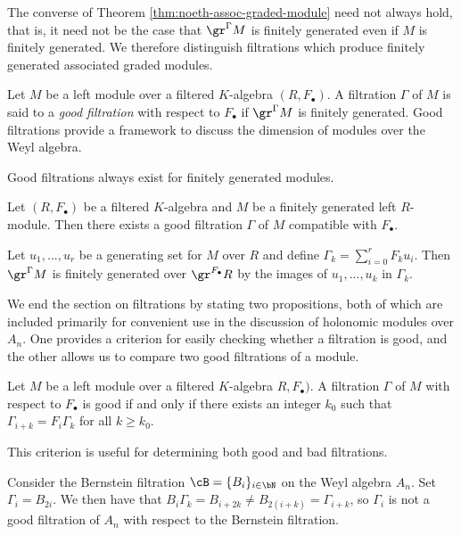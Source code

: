 The converse of Theorem \ref{thm:noeth-assoc-graded-module} need not always hold, that is, it need not be the case that $\gr^{\Gamma}M$ is finitely generated even if $M$ is finitely generated. We therefore distinguish filtrations which produce finitely generated associated graded modules.
\begin{defn}\label{defn:good-filtration}
	Let $M$ be a left module over a filtered $K$-algebra $(R,F_\bullet)$. A filtration $\Gamma$ of $M$ is said to a \emph{good filtration} with respect to $F_\bullet$ if $\gr^\Gamma M$ is finitely generated. Good filtrations provide a framework to discuss the dimension of modules over the Weyl algebra.
\end{defn}
Good filtrations always exist for finitely generated modules.
\begin{prop}\label{prop:good-filtrations-exist}
	Let $(R,F_\bullet)$ be a filtered $K$-algebra and $M$ be a finitely generated left $R$-module. Then there exists a good filtration $\Gamma$ of $M$ compatible with $F_\bullet$.
\end{prop}
\begin{prf}
	Let $u_1,...,u_r$ be a generating set for $M$ over $R$ and define $\Gamma_k = \sum_{i=0}^rF_ku_i$. Then $\gr^\Gamma M$ is finitely generated over $\gr^{F_\bullet} R$ by the images of $u_1,...,u_k$ in $\Gamma_k$.
\end{prf}
We end the section on filtrations by stating two propositions, both of which are included primarily for convenient use in the discussion of holonomic modules over $A_n$. One provides a criterion for easily checking whether a filtration is good, and the other allows us to compare two good filtrations of a module.
\begin{prop}\label{prop:criterion-good-filtration}
	Let $M$ be a left module over a filtered $K$-algebra $R,F_\bullet)$. A filtration $\Gamma$ of $M$ with respect to $F_\bullet$ is good if and only if there exists an integer $k_0$ such that $\Gamma_{i+k} = F_i\Gamma_k$ for all $k \geq k_0$.
\end{prop}
\begin{prf}
	\cite[Proposition 8.3.1]{d-mod-primer}
\end{prf}
This criterion is useful for determining both good and bad filtrations.
\begin{example}\label{example:bad-filtration}
	Consider the Bernstein filtration $\cB = \{B_i\}_{i\in \bN}$ on the Weyl algebra $A_n$. Set $\Gamma_i = B_{2i}$. We then have that $B_i\Gamma_k = B_{i+2k} \neq B_{2(i+k)} = \Gamma_{i+k}$, so $\Gamma_i$ is not a good filtration of $A_n$ with respect to the Bernstein filtration.
\end{example}
